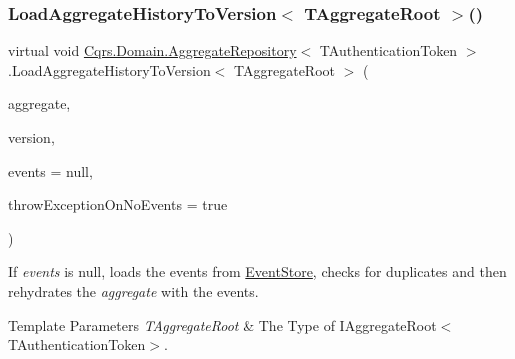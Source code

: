 \subsubsection{\texorpdfstring{Load\+Aggregate\+History\+To\+Version$<$ T\+Aggregate\+Root $>$()}{LoadAggregateHistoryToVersion< TAggregateRoot >()}}
{\footnotesize\ttfamily virtual void \hyperlink{classCqrs_1_1Domain_1_1AggregateRepository}{Cqrs.\+Domain.\+Aggregate\+Repository}$<$ T\+Authentication\+Token $>$.Load\+Aggregate\+History\+To\+Version$<$ T\+Aggregate\+Root $>$ (\begin{DoxyParamCaption}\item[{T\+Aggregate\+Root}]{aggregate,  }\item[{int}]{version,  }\item[{I\+List$<$ \hyperlink{interfaceCqrs_1_1Events_1_1IEvent}{I\+Event}$<$ T\+Authentication\+Token $>$$>$}]{events = {\ttfamily null},  }\item[{bool}]{throw\+Exception\+On\+No\+Events = {\ttfamily true} }\end{DoxyParamCaption})\hspace{0.3cm}{\ttfamily [virtual]}}



If {\itshape events}  is null, loads the events from \hyperlink{namespaceCqrs_1_1EventStore}{Event\+Store}, checks for duplicates and then rehydrates the {\itshape aggregate}  with the events. 


\begin{DoxyTemplParams}{Template Parameters}
{\em T\+Aggregate\+Root} & The Type of I\+Aggregate\+Root$<$\+T\+Authentication\+Token$>$.\\
\hline
\end{DoxyTemplParams}

